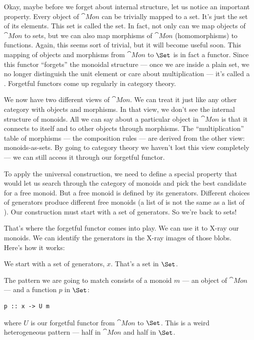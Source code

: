 Okay, maybe before we forget about internal structure, let us notice an
important property. Every object of $\cat{Mon}$ can be trivially mapped
to a set. It's just the set of its elements. This set is called the
 set. In fact, not only can we map objects of
$\cat{Mon}$ to sets, but we can also map morphisms of $\cat{Mon}$
(homomorphisms) to functions. Again, this seems sort of trivial, but it
will become useful soon. This mapping of objects and morphisms from
$\cat{Mon}$ to $\Set$ is in fact a functor. Since this functor
``forgets'' the monoidal structure --- once we are inside a plain set,
we no longer distinguish the unit element or care about multiplication
--- it's called a . Forgetful functors come up
regularly in category theory.

We now have two different views of $\cat{Mon}$. We can treat it just
like any other category with objects and morphisms. In that view, we
don't see the internal structure of monoids. All we can say about a
particular object in $\cat{Mon}$ is that it connects to itself and to
other objects through morphisms. The ``multiplication'' table of
morphisms --- the composition rules --- are derived from the other view:
monoids-as-sets. By going to category theory we haven't lost this view
completely --- we can still access it through our forgetful functor.

To apply the universal construction, we need to define a special
property that would let us search through the category of monoids and
pick the best candidate for a free monoid. But a free monoid is defined
by its generators. Different choices of generators produce different
free monoids (a list of  is not the same as a list of
). Our construction must start with a set of generators. So
we're back to sets!

That's where the forgetful functor comes into play. We can use it to
X-ray our monoids. We can identify the generators in the X-ray images of
those blobs. Here's how it works:

We start with a set of generators, $x$. That's a set in
$\Set$.

The pattern we are going to match consists of a monoid $m$ --- an
object of $\cat{Mon}$ --- and a function $p$ in $\Set$:

\begin{Verbatim}
p :: x -> U m
\end{Verbatim}
where $U$ is our forgetful functor from $\cat{Mon}$ to
$\Set$. This is a weird heterogeneous pattern --- half in
$\cat{Mon}$ and half in $\Set$.

